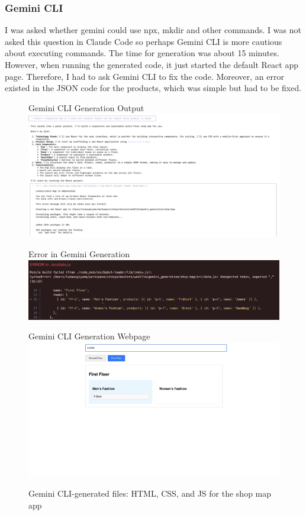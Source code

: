 \documentclass[10pt]{article}
\begin{document}
\subsubsection{Gemini CLI}
I was asked whether gemini could use npx, mkdir and other commands.
I was not asked this question in Claude Code so perhaps Gemini CLI is more cautious about executing commands.
The time for generation was about 15 minutes.
However, when running the generated code, it just started the default React app page.
Therefore, I had to ask Gemini CLI to fix the code.
Moreover, an error existed in the JSON code for the products, which was simple but had to be fixed.
\begin{figure}
    \centering
    \begin{subcaptionbox}[0.3\linewidth]{Gemini CLI Generation Output\label{fig:gemini_cg_output}}
        {\includegraphics[width=0.3\linewidth]{figures/gemini_cg_output.png}}
    \end{subcaptionbox}
    \hfill
    \begin{subcaptionbox}[0.3\linewidth]{Error in Gemini Generation\label{fig:gemini_cli}}
        {\includegraphics[width=0.3\linewidth]{figures/gemini_cg_error.png}}
    \end{subcaptionbox}
    \hfill
    \begin{subcaptionbox}[0.3\linewidth]{Gemini CLI Generation Webpage\label{fig:gemini_cg_web}}
        {\includegraphics[width=0.3\linewidth]{figures/gemini_cg_web.png}}
    \end{subcaptionbox}
    \caption{Gemini CLI-generated files: HTML, CSS, and JS for the shop map app}
    \label{fig:gemini_code_output}
\end{figure}
\end{document}
